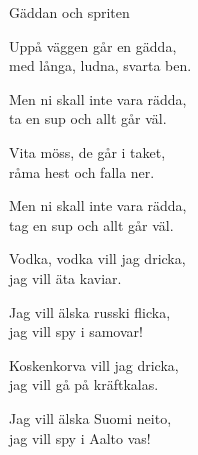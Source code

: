 \begin{song}{Gäddan och spriten}
	
	
	

    \showversenumber	
	Uppå väggen går en gädda,\\
	med långa, ludna, svarta ben.\\
	\begin{repetition}
	Men ni skall inte vara rädda,\\
	ta en sup och allt går väl.
	\end{repetition}
	
    \showversenumber
	Vita möss, de går i taket,\\
	råma hest och falla ner.\\
	\begin{repetition}
	Men ni skall inte vara rädda,\\
	tag en sup och allt går väl.
	\end{repetition}
	
    \showversenumber
	Vodka, vodka vill jag dricka,\\
	jag vill äta kaviar.\\
	\begin{repetition}
	Jag vill älska russki flicka,\\
	jag vill spy i samovar!
	\end{repetition}
	
    \showversenumber
	Koskenkorva vill jag dricka,\\
	jag vill gå på kräftkalas.\\
	\begin{repetition}
	Jag vill älska Suomi neito,\\
	jag vill spy i Aalto vas!
	\end{repetition}
	
\end{song}
